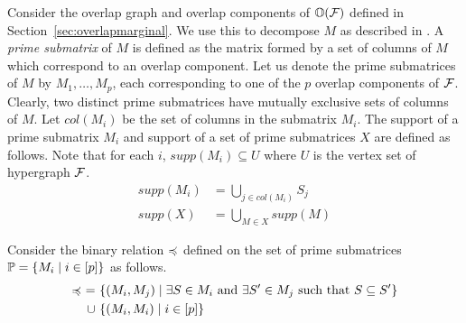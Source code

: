 Consider the overlap graph and overlap components of $\mathbb O({\cal F})$
defined in Section~\ref{sec:overlapmarginal}.  We use this to
decompose $M$ as described in \cite{wlh02,nsnrs09}.  A {\em prime
  submatrix} of $M$ is defined as the matrix formed by a set of
columns of $M$ which correspond to an overlap component.  Let us
denote the prime submatrices of $M$ by $M_1,\ldots,M_p$, each
corresponding to one of the $p$ overlap components of ${\cal F}$. Clearly,
two distinct prime submatrices have mutually exclusive sets of columns
of $M$.  Let $col(M_i)$ be the set of columns in the submatrix $M_i$.
The support of a prime submatrix $M_i$ and support of a set of prime
submatrices $X$ are defined as follows. Note that for each $i$,
$supp(M_i) \subseteq U$ where $U$ is the vertex set of hypergraph
${\cal F}$.
\begin{align*}
supp(M_i) &= \displaystyle \bigcup_{j \in col(M_i)}S_j\\  
supp(X) &= \displaystyle  \bigcup_{M \in X} supp(M)
\end{align*}






\noindent
Consider the binary relation $\preccurlyeq$ defined on the set of
prime submatrices $\mathbb P = \{M_i \mid i \in [p]\}$ as follows.
\begin{align*}
  \primeless \ = \ &\{(M_i,M_j) \mid \exists S \in
  M_i \text{ and } \exists S' \in M_j \text{ \stt\ } S \subseteq S'\} \\
  \cup \  &\{(M_i,M_i) \mid i \in [p]\}
\end{align*}


